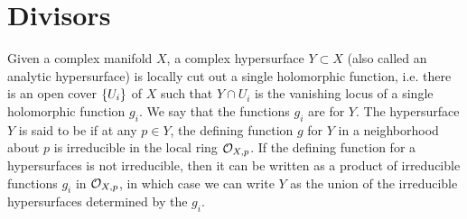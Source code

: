 %
\section{Divisors}
%
Given a complex manifold $X$, a complex hypersurface $Y \subset X$ (also called an
analytic hypersurface) is locally cut out a single holomorphic function, i.e. there is
an open cover $\left\lbrace U_i \right\rbrace$ of $X$ such that $Y \cap U_i$ is the vanishing locus of a
single holomorphic function $g_i$. We say that the functions $g_i$ are
 for $Y$. The hypersurface $Y$ is said to be 
if at any $p \in Y$, the defining function $g$ for $Y$ in a neighborhood about
$p$ is irreducible in the local ring $\mathcal{O}_{X,p}$. If the defining function for a
hypersurfaces is not irreducible, then it can be written as a product of irreducible
functions $g_i$ in $\mathcal{O}_{X,p}$, in which case we can write $Y$ as the union of the
irreducible hypersurfaces determined by the $g_i$. \\

